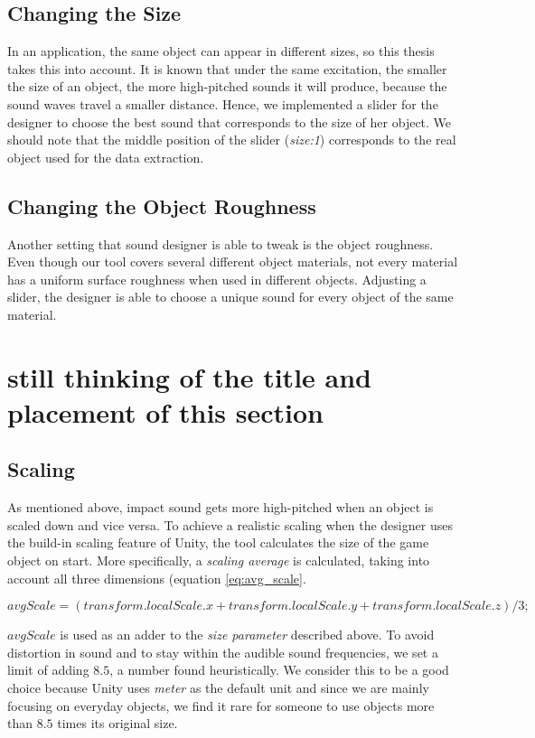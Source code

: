 \subsection{Changing the Size}
In an application, the same object can appear in different sizes, so this thesis takes this into account. It is known that under the same excitation, the smaller the size of an object, the more high-pitched sounds it will produce, because the sound waves travel a smaller distance. Hence, we implemented a slider for the designer to choose the best sound that corresponds to the size of her object. We should note that the middle position of the slider (\textit{size:1}) corresponds to the real object used for the data extraction.

\subsection{Changing the Object Roughness}
Another setting that sound designer is able to tweak is the object roughness. Even though our tool covers several different object materials, not every material has a uniform surface roughness when used in different objects. Adjusting a slider, the designer is able to choose a unique sound for every object of the same material. 


\section{still thinking of the title and placement of this section}
\subsection{Scaling}
As mentioned above, impact sound gets more high-pitched when an object is scaled down and vice versa. To achieve a realistic scaling when the designer uses the build-in scaling feature of Unity\textregistered, the tool calculates the size of the game object on start. More specifically, a \textit{scaling average} is calculated, taking into account all three dimensions (equation \ref{eq:avg_scale}.

\begin{equation}\label{eq:avg_scale}
avgScale = (transform.localScale.x + transform.localScale.y + transform.localScale.z) / 3;
\end{equation}

$avgScale$ is used as an adder to the \textit{size parameter} described above. To avoid distortion in sound and to stay within the audible sound frequencies, we set a limit of adding $8.5$, a number found heuristically. We consider this to be a good choice because Unity uses \textit{meter} as the default unit and since we are mainly focusing on everyday objects, we find it rare for someone to use objects more than $8.5$ times its original size.

